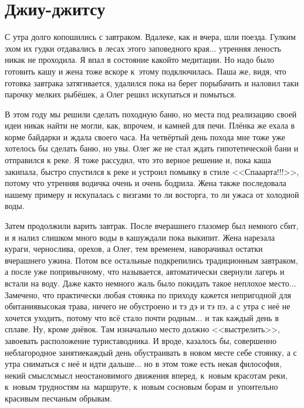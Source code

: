 \chapter{Джиу-джитсу} 
\vepsianrose

С утра долго копошились с завтраком. Вдалеке, как и вчера, шли поезда. Гулким эхом их гудки отдавались в лесах этого заповедного края$\ldots$ утренняя леность никак не проходила. Я впал в состояние какой\sdash то медитации. Но надо было готовить кашу и жена тоже вскоре к~этому подключилась. Паша же, видя, что готовка завтрака затягивается, удалился пока на берег порыбачить и наловил таки парочку мелких рыбёшек, а Олег решил искупаться и помыться. 

В этом году мы решили сделать походную баню, но места под реализацию своей идеи никак найти не могли, как, впрочем, и камней для печи. Плёнка же ехала в корме байдарки и ждала своего часа. На четвёртый день похода мне тоже уже хотелось бы сделать баню, но увы. Олег же не стал ждать гипотетической бани и отправился к реке. Я тоже рассудил, что это верное решение и, пока каша закипала, быстро спустился к реке и устроил помывку в стиле <<Спа\sdash а\sdash арта!!!>>, потому что утренняя водичка очень и очень бодрила. Жена также последовала нашему примеру и искупалась с визгами то ли восторга, то ли ужаса от холодной воды. 

Затем продолжили варить завтрак. После вчерашнего глазомер был немного сбит, и я налил слишком много воды в кашу\mdash ждали пока выкипит. Жена нарезала кураги, чернослива, орехов, а Олег, тем временем, наворачивал остатки вчерашнего ужина. Потом все остальные подкрепились традиционным завтраком, а после уже по\sdash привычному, что называется, автоматически свернули лагерь и встали на воду. Даже как\sdash то немного жаль было покидать такое неплохое место$\ldots$ Замечено, что практически любая стоянка по приходу кажется непригодной для обитания\mdash высокая трава, ничего не обустроено и тэ дэ и тэ пэ, а с утра с неё не хочется уходить, потому что всё стало почти родным$\ldots$ и так каждый день в сплаве. Ну, кроме днёвок. Там изначально место должно <<выстрелить>>, завоевать расположение туриста\sdash водника. И вроде, казалось бы, совершенно неблагородное занятие\mdash каждый день обустраивать в новом месте себе стоянку, а с утра сниматься с неё и идти дальше$\ldots$ но в этом тоже есть некая философия, некий смысл\mdash смысл неостановимого движения вперед, к~новым красотам реки, к~новым трудностям на~маршруте, к~новым сосновым борам и~упоительно красивым песчаным обрывам.

